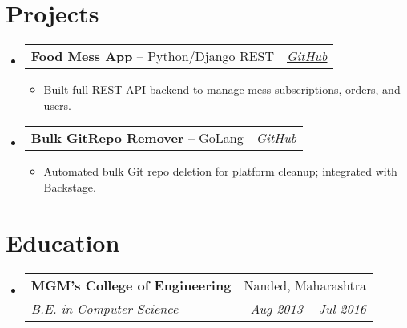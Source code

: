 \documentclass[letterpaper, 11pt]{article}
\makeatletter
\newcommand{\resumeItem}[1]{\item \small {#1 \vspace{-3pt}}}
\newcommand{\resumeSubheading}[4]{
  \vspace{-2pt}\item
    \begin{tabular*}{0.99\textwidth}[t]{l@{\extracolsep{\fill}}r}
      \textbf{#1} & #2 \\
      \textit{\small#3} & \textit{\small #4} \\
    \end{tabular*}\vspace{-7pt}
}
\newcommand{\resumeProjectHeading}[2]{
    \item
    \begin{tabular*}{0.99\textwidth}{l@{\extracolsep{\fill}}r}
      \small#1 & \textit{#2}\\
    \end{tabular*}\vspace{-7pt}
}
\newcommand{\resumeItemListStart}{\begin{itemize}[leftmargin=0.25in, label={\textbullet}]}
\newcommand{\resumeItemListEnd}{\end{itemize}\vspace{-10pt}}
\newcommand{\resumeSubHeadingListStart}{\begin{itemize}[leftmargin=0.15in, label={}]}\newcommand{\resumeSubHeadingListEnd}{\end{itemize}}
\makeatother
\begin{document}
\vspace{-10pt}

\section{Projects}
\resumeSubHeadingListStart{}
\resumeProjectHeading{\textbf{Food Mess App} -- Python/Django REST}{\href{https://github.com/shubham1507/FoodApp}{GitHub}}
\resumeItemListStart{}
\resumeItem{Built full REST API backend to manage mess subscriptions, orders, and users.}
\resumeItemListEnd{}
\vspace{5pt} 
\resumeProjectHeading{\textbf{Bulk GitRepo Remover} -- GoLang}{\href{https://github.com/shubham1507/Bulk_GitRepo_Remover}{GitHub}}
\resumeItemListStart{}
\resumeItem{Automated bulk Git repo deletion for platform cleanup; integrated with Backstage.}
\resumeItemListEnd{}
\resumeSubHeadingListEnd{}

\vspace{-10pt}

\section{Education}
\resumeSubHeadingListStart{}
\resumeSubheading{MGM's College of Engineering}{Nanded, Maharashtra}{B.E. in Computer Science}{Aug 2013 -- Jul 2016}
\resumeSubHeadingListEnd{}
\end{document}
